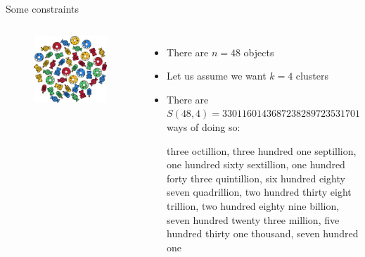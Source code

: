 \documentclass[aspectratio=169]{beamer}
\begin{document}
  \begin{frame}{Some constraints}
    \begin{columns}
        \begin{figure}
          \includegraphics[width=\linewidth]{Figures/Candy_mountain}
        \end{figure}
        \begin{itemize}
          \item There are $n = 48$ objects
          \item Let us assume we want $k = 4$ clusters
          \item There are $S(48, 4) = 3301160143687238289723531701$ ways
            of doing so:
            \begin{scriptsize}
              three octillion, three hundred one septillion, one hundred
              sixty sextillion, one hundred forty three quintillion, six
              hundred eighty seven quadrillion, two hundred thirty eight
              trillion, two hundred eighty nine billion, seven hundred
              twenty three million, five hundred thirty one thousand,
              seven hundred one
            \end{scriptsize}
        \end{itemize}
    \end{columns}
  \end{frame}
\end{document}
